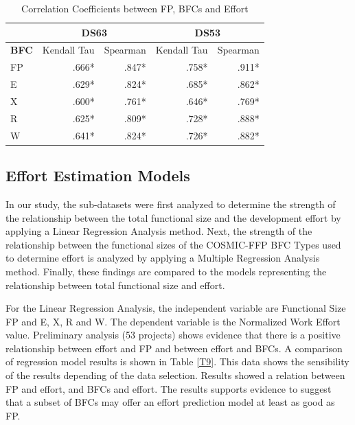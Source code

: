 \documentclass[conference]{IEEEtran}
\begin{document}
\begin{table}
\centering
\caption{Correlation Coefficients between FP, BFCs and Effort}
\label{T11}
\begin{tabular}{|l|r|r|r|r|}\hline
& \multicolumn{2}{c}{\textbf{DS63}}  & \multicolumn{2}{c}{\textbf{DS53}}\\\hline 
\textbf{BFC}   & Kendall Tau      & Spearman      & Kendall Tau  & Spearman \\\hline 
FP & .666* & .847* &  .758* & .911* \\
E  & .629* & .824* &  .685* & .862* \\
X  & .600* & .761* &  .646* & .769* \\
R  & .625* & .809* &  .728* & .888* \\
W  & .641* & .824* &  .726* & .882*\\\hline 
\end{tabular}
\end{table}

\subsection{Effort Estimation Models}

In our study, the sub-datasets were first analyzed to determine the strength of the relationship between the total functional size and the development effort by applying a Linear Regression Analysis method. Next, the strength of the relationship between the functional sizes of the COSMIC-FFP BFC Types used to determine effort is analyzed by applying a Multiple Regression Analysis method. Finally, these findings are compared to the models representing the relationship between total functional size and effort.

For the Linear Regression Analysis, the independent variable are Functional Size FP and E, X, R and W. The dependent variable is the Normalized Work Effort value. Preliminary analysis (53 projects) shows evidence that there is a positive relationship between effort and FP and between effort and BFCs. A comparison of regression model results is shown in Table \ref{T9}. This data shows the sensibility of the results depending of the data selection. Results showed a relation between FP and effort, and BFCs and effort. The results supports evidence to suggest that a subset of BFCs may offer an effort prediction model at least as good as FP.
\end{document}
